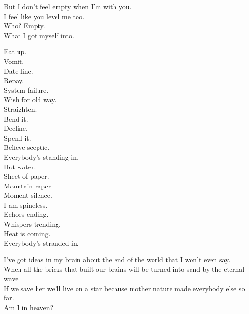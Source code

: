 But I don't feel empty when I'm with you. \\
I feel like you level me too. \\
Who? Empty. \\

What I got myself into. \\




Eat up. \\
Vomit. \\
Date line. \\
Repay. \\
System failure. \\
Wish for old way. \\
Straighten. \\
Bend it. \\
Decline. \\
Spend it. \\
Believe sceptic. \\
Everybody's standing in. \\

Hot water. \\

Sheet of paper. \\
Mountain raper. \\
Moment silence. \\
I am spineless. \\
Echoes ending. \\
Whispers trending. \\
Heat is coming. \\
Everybody's stranded in. \\




I've got ideas in my brain about the end of the world that I won't even say. \\
When all the bricks that built our brains will be turned into sand by the eternal wave. \\
If we save her we'll live on a star because mother nature made everybody else so far. \\

Am I in heaven? \\

